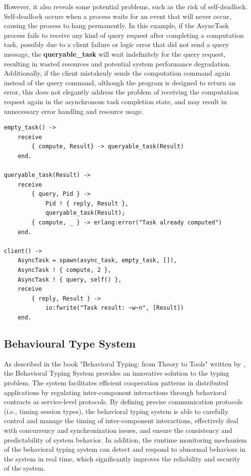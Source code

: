 \documentclass{l4proj}
\begin{document}
However, it also reveals some potential problems, such as the risk of self-deadlock. Self-deadlock occurs when a process waits for an event that will never occur, causing the process to hang permanently. In this example, if the AsyncTask process fails to receive any kind of query request after completing a computation task, possibly due to a client failure or logic error that did not send a query message, the \textbf{queryable\_task} will wait indefinitely for the query request, resulting in wasted resources and potential system performance degradation. Additionally, if the client mistakenly sends the computation command again instead of the query command, although the program is designed to return an error, this does not elegantly address the problem of receiving the computation request again in the asynchronous task completion state, and may result in unnecessary error handling and resource usage.

\lstset{style=erlangstyle}
\begin{lstlisting}[caption={Asynchronous task handling and querying implemented in Erlang}, label={lst:erlangExample}]
empty_task() ->
    receive
        { compute, Result} -> queryable_task(Result)
    end.
    
queryable_task(Result) ->
    receive
        { query, Pid } -> 
            Pid ! { reply, Result },
            queryable_task(Result); 
        { compute, _ } -> erlang:error("Task already computed") 
    end.
    
client() ->
    AsyncTask = spawn(async_task, empty_task, []),
    AsyncTask ! { compute, 2 },
    AsyncTask ! { query, self() },
    receive
        { reply, Result } ->
            io:fwrite("Task result: ~w~n", [Result])
    end.
\end{lstlisting}

\subsection{Behavioural Type System}
As described in the book "Behavioral Typing: from Theory to Tools" written by \cite{gay_2017_behavioural}, the Behavioral Typing System provides an innovative solution to the typing problem. The system facilitates efficient cooperation patterns in distributed applications by regulating inter-component interactions through behavioral contracts as service-level protocols. By defining precise communication protocols (i.e., timing session types), the behavioral typing system is able to carefully control and manage the timing of inter-component interactions, effectively deal with concurrency and synchronization issues, and ensure the consistency and predictability of system behavior. In addition, the runtime monitoring mechanism of the behavioral typing system can detect and respond to abnormal behaviors in the system in real time, which significantly improves the reliability and security of the system.
\end{document}
